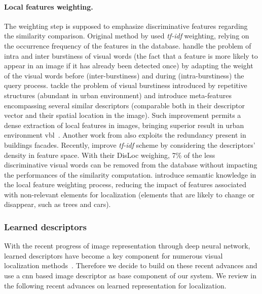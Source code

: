 \paragraph{Local features weighting.} The weighting step is supposed to emphasize discriminative features regarding the similarity comparison.	Original method by \citep{Sivic2003} used \textit{tf-idf} weighting, relying on the occurrence frequency of the features in the database. \citet{Jegou2009} handle the problem of intra and inter burstiness of visual words (\ie the fact that a feature is more likely to appear in an image if it has already been detected once) by adapting the weight of the visual words before (inter-burstiness) and during (intra-burstiness) the query process. \citet{Torii2013} tackle the problem of visual burstiness introduced by repetitive structures (abundant in urban environment) and introduce meta-features encompassing several similar descriptors (comparable both in their descriptor vector and their spatial location in the image). Such improvement permits a dense extraction of local features in images, bringing superior result in urban environment \ac{vbl}~\citep{Qu2016,Torii2015}. Another work from \citet{Morago2016} also exploits the redundancy present in buildings facades. Recently, \citet{Arandjelovic2014} improve \textit{tf-idf} scheme by considering the descriptors' density in feature space. With their DisLoc weighing, 7\% of the less discriminative visual words can be removed from the database without impacting the performances of the similarity computation. \citet{Mousavian2015} introduce semantic knowledge in the local feature weighting process, reducing the impact of features associated with non-relevant elements for localization (\ie elements that are likely to change or disappear, such as trees and cars).

\subsubsection{Learned descriptors} \label{subsec:cnn_as_global_desc}
With the recent progress of image representation through deep neural network, learned descriptors have become a key component for numerous visual localization methods~\cite{Sunderhauf2015a, Sattler2017a, Schonberger2017a, Sarlin2018, Sarlin2018a, Germain2019, Paulin2017}. Therefore we decide to build on these recent advances and use a \ac{cnn} based image descriptor as base component of our system.  We review in the following recent advances on learned representation for localization.

